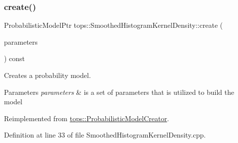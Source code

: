 \subsubsection{\texorpdfstring{create()}{create()}}
{\footnotesize\ttfamily Probabilistic\+Model\+Ptr tops\+::\+Smoothed\+Histogram\+Kernel\+Density\+::create (\begin{DoxyParamCaption}\item[{\hyperlink{classtops_1_1ProbabilisticModelParameters}{Probabilistic\+Model\+Parameters} \&}]{parameters }\end{DoxyParamCaption}) const\hspace{0.3cm}{\ttfamily [virtual]}}



Creates a probability model. 


\begin{DoxyParams}{Parameters}
{\em parameters} & is a set of parameters that is utilized to build the model \\
\hline
\end{DoxyParams}


Reimplemented from \hyperlink{classtops_1_1ProbabilisticModelCreator_afed6c8ffa45fff446bdaa8b533da8f7c}{tops\+::\+Probabilistic\+Model\+Creator}.



Definition at line 33 of file Smoothed\+Histogram\+Kernel\+Density.\+cpp.


